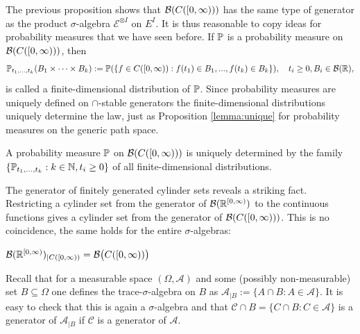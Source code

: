 The previous proposition shows that $\cB ( C([0,\infty)))$ has the same type of generator as the product $\sigma$-algebra $\mathcal E^{\otimes I}$ on $E^I$. It is thus reasonable to copy ideas for probability measures that we have seen before. If $\P$ is a probability measure on $\cB ( C([0,\infty)))$, then
\begin{align*}
	\P_{t_1,...,t_k}(B_1\times \cdots\times B_k):= \P(\{f\in C([0,\infty)): f(t_1)\in B_1,... ,f(t_k)\in B_k\}),\quad t_i\geq 0, B_i\in \mathcal B(\R),
\end{align*}
is called a finite-dimensional distribution of $\P$. Since probability measures are uniquely defined on $\cap$-stable generators the finite-dimensional distributions uniquely determine the law, just as Proposition \ref{lemma:unique} for probability measures on the generic path space.
\begin{laussagewerkzeug}
\begin{corollary}\label{prop:uniqueC}
	A probability measure $\P$ on $\cB( C([0,\infty)))$ is uniquely determined by the family $\{\P_{t_1,...,t_k}: k\in\N, t_i\geq 0\}$ of all finite-dimensional distributions.
\end{corollary}
\end{laussagewerkzeug}
The generator of finitely generated cylinder sets reveals a striking fact. Restricting a cylinder set from the generator of $\mathcal B(\R^{[0,\infty)})$ to the continuous functions gives a cylinder set from the generator of $\cB( C([0,\infty)))$. This is no coincidence, the same holds for the entire $\sigma$-algebras:
\begin{laussagewerkzeug}
\begin{prop}\label{prop:spur}
	$\mathcal B(\R^{[0,\infty)})_{|C([0,\infty))}=\cB \big( C([0,\infty))\big)$
\end{prop}
\end{laussagewerkzeug}
Recall that for a measurable space $(\Omega, \mathcal A)$ and some (possibly non-measurable) set $B\subseteq \Omega$ one defines the trace-$\sigma$-algebra on $B$ as $\mathcal A_{|B}:=\{A\cap B: A\in \mathcal A\}$. It is easy to check that this is again a $\sigma$-algebra and that $\mathcal C\cap B=\{C\cap B: C\in \mathcal A\}$ is a generator of $\mathcal A_{|B}$ if $\mathcal C$ is a generator of $\mathcal A$.
